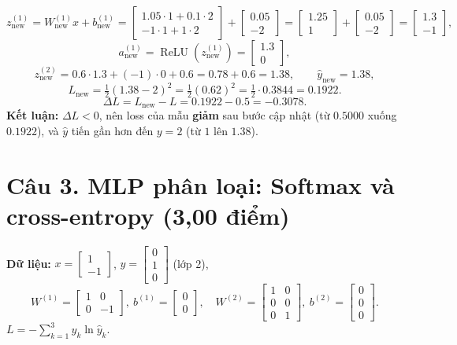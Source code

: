\documentclass[12pt,a4paper]{article}
\newcommand{\relu}{\operatorname{ReLU}}
\begin{document}
\[
z^{(1)}_{\text{new}}=W^{(1)}_{\text{new}}x+b^{(1)}_{\text{new}}
=\begin{bmatrix}1.05\cdot1+0.1\cdot2\\-1\cdot1+1\cdot2\end{bmatrix}+\begin{bmatrix}0.05\\-2\end{bmatrix}
=\begin{bmatrix}1.25\\1\end{bmatrix}+\begin{bmatrix}0.05\\-2\end{bmatrix}
=\begin{bmatrix}1.3\\-1\end{bmatrix},
\]
\[
a^{(1)}_{\text{new}}=\relu(z^{(1)}_{\text{new}})=\begin{bmatrix}1.3\\0\end{bmatrix},
\]
\[
z^{(2)}_{\text{new}}=0.6\cdot1.3+(-1)\cdot0+0.6=0.78+0.6=1.38,\qquad
\hat y_{\text{new}}=1.38,
\]
\[
L_{\text{new}}=\tfrac12(1.38-2)^2=\tfrac12(0.62)^2=\tfrac12\cdot0.3844=\boxed{0.1922}.
\]
\[
\Delta L=L_{\text{new}}-L=0.1922-0.5=\boxed{-0.3078}.
\]
\textbf{Kết luận:} $\Delta L<0$, nên loss của mẫu \textbf{giảm} sau bước cập nhật (từ $0.5000$ xuống $0.1922$), và $\hat y$ tiến gần hơn đến $y=2$ (từ $1$ lên $1.38$).

\section*{Câu 3. MLP phân loại: Softmax và cross-entropy (3,00 điểm)}

\textbf{Dữ liệu:} $x=\begin{bmatrix}1\\-1\end{bmatrix}$, $y=\begin{bmatrix}0\\1\\0\end{bmatrix}$ (lớp 2),
\[
W^{(1)}=\begin{bmatrix}1&0\\0&-1\end{bmatrix},\ b^{(1)}=\begin{bmatrix}0\\0\end{bmatrix},\quad
W^{(2)}=\begin{bmatrix}1&0\\0&0\\0&1\end{bmatrix},\ b^{(2)}=\begin{bmatrix}0\\0\\0\end{bmatrix}.
\]
$L=-\sum_{k=1}^{3}y_k\ln\hat y_k$.
\end{document}
